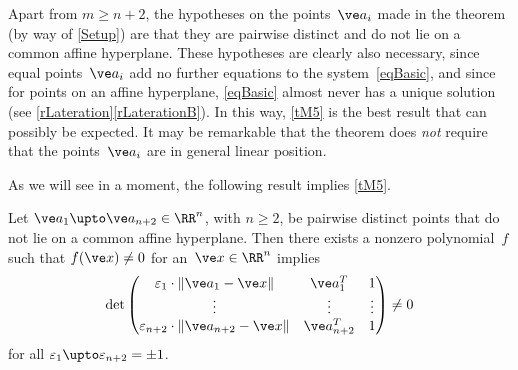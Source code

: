 \documentclass[reqno]{amsart}
\begin{document}
\begin{rem*}
  Apart from $m \ge n + 2$, the hypotheses on the points~$\ve a_i$
  made in the theorem (by way of \cref{Setup}) are that they are
  pairwise distinct and do not lie on a common affine
  hyperplane. These hypotheses are clearly also necessary, since equal
  points~$\ve a_i$ add no further equations to the
  system~\eqref{eqBasic}, and since for points on an affine
  hyperplane, \eqref{eqBasic} almost never has a unique solution (see
  \cref{rLateration}\ref{rLaterationB}). In this way, \cref{tM5} is
  the best result that can possibly be expected. It may be remarkable
  that the theorem does {\em not} require that the points~$\ve a_i$
  are in general linear position.
\end{rem*}

As we will see in a moment, the following result implies \cref{tM5}.

\begin{prop} \label{pM5}%
  Let $\ve a_1 \upto \ve a_{n+2} \in \RR^n$, with $n \ge 2$, be
  pairwise distinct points that do not lie on a common affine
  hyperplane. Then there exists a nonzero polynomial~$f$ such that
  $f(\ve x) \ne 0$ for an~$\ve x \in \RR^n$ implies
  \begin{equation} \label{eqAPM}%
    \det
    \begin{pmatrix}
      \varepsilon_1 \cdot \lVert\ve a_1 - \ve x\rVert & \ve a_1^T & 1 \\
      \vdots & \vdots & \vdots \\
      \varepsilon_{n+2} \cdot \lVert\ve a_{n+2} - \ve x\rVert & \ve
      a_{n+2}^T & 1
    \end{pmatrix} \ne 0
  \end{equation}
  for all $\varepsilon_1 \upto \varepsilon_{n+2} = \pm 1$.
\end{prop}
\end{document}
